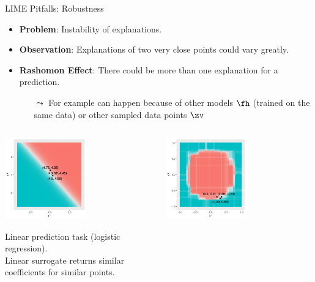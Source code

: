 \documentclass[11pt,compress,t,notes=noshow, aspectratio=169, xcolor=table]{beamer}
\begin{document}
\begin{vbframe}[c]{LIME Pitfalls: Robustness }
\begin{itemize}
	\item \textbf{Problem}: Instability of explanations. 
	\item \textbf{Observation}: Explanations of two very close points could vary greatly. 
	\item \textbf{Rashomon Effect}: There could be more than one explanation for a prediction.
	\begin{itemize}
	    \item[$\leadsto$] For example can happen because of other models $\fh$ (trained on the same data) or other sampled data points $\zv$
	\end{itemize}
\end{itemize}
\vspace{-0.7cm}
\begin{columns}
	\begin{column}{0.48\textwidth}
		\begin{center}
		
		\includegraphics[width=0.55\textwidth]{figure/lime_robustness_1.png}
		
		{Linear prediction task (logistic regression). \\Linear surrogate returns similar coefficients for similar points.}
		
		\end{center}
	\end{column}
	\begin{column}{0.48\textwidth}
		\begin{center}
	\includegraphics[width=0.55\textwidth]{figure/lime_robustness_2.png}
	

\end{center}
\end{column}
\end{columns}
\end{vbframe}
\end{document}
